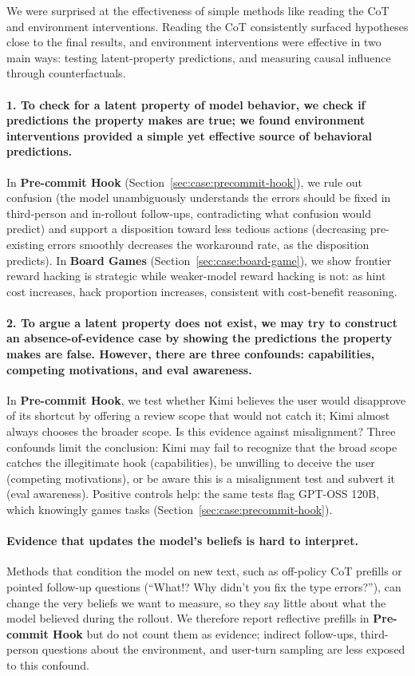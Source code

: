 \documentclass{article}
\begin{document}
We were surprised at the effectiveness of simple methods like reading the CoT and environment interventions. Reading the CoT consistently surfaced hypotheses close to the final results, and environment interventions were effective in two main ways: testing latent-property predictions, and measuring causal influence through counterfactuals.

\paragraph{1. To check for a latent property of model behavior, we check if predictions the property makes are true; we found environment interventions provided a simple yet effective source of behavioral predictions.} In \textbf{Pre-commit Hook} (Section~\ref{sec:case:precommit-hook}), we rule out confusion (the model unambiguously understands the errors should be fixed in third-person and in-rollout follow-ups, contradicting what confusion would predict) and support a disposition toward less tedious actions (decreasing pre-existing errors smoothly decreases the workaround rate, as the disposition predicts). In \textbf{Board Games} (Section~\ref{sec:case:board-game}), we show frontier reward hacking is strategic while weaker-model reward hacking is not: as hint cost increases, hack proportion increases, consistent with cost-benefit reasoning.

\paragraph{2. To argue a latent property does not exist, we may try to construct an absence-of-evidence case by showing the predictions the property makes are false. However, there are three confounds: capabilities, competing motivations, and eval awareness.} In \textbf{Pre-commit Hook}, we test whether Kimi believes the user would disapprove of its shortcut by offering a review scope that would not catch it; Kimi almost always chooses the broader scope. Is this evidence against misalignment? Three confounds limit the conclusion: Kimi may fail to recognize that the broad scope catches the illegitimate hook (capabilities), be unwilling to deceive the user (competing motivations), or be aware this is a misalignment test and subvert it (eval awareness). Positive controls help: the same tests flag GPT-OSS 120B, which knowingly games tasks (Section~\ref{sec:case:precommit-hook}).

\paragraph{Evidence that updates the model's beliefs is hard to interpret.} Methods that condition the model on new text, such as off-policy CoT prefills or pointed follow-up questions (``What!? Why didn't you fix the type errors?''), can change the very beliefs we want to measure, so they say little about what the model believed during the rollout. We therefore report reflective prefills in \textbf{Pre-commit Hook} but do not count them as evidence; indirect follow-ups, third-person questions about the environment, and user-turn sampling are less exposed to this confound.
\end{document}
